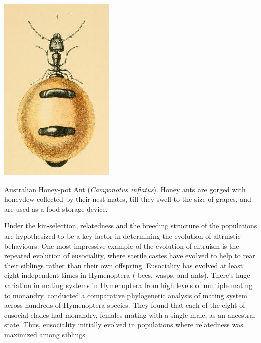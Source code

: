 \begin{marginfigure}
\begin{center}
\includegraphics[width= 0.7 \textwidth]{illustration_images/Quant_gen/honey_ant/honey_ant.png}
\end{center}
\caption{Australian Honey-pot Ant ({\it Camponotus inflatus}). Honey ants are gorged with
  honeydew collected by their nest mates, till they swell to the size
  of grapes, and are used as a food storage
  device.    } \label{fig:honey_ant}
\end{marginfigure} 
Under the kin-selection, relatedness and the breeding structure of the populations are
hypothesized to be a key factor in determining the evolution of altruistic behaviours. 
One most impressive example of the evolution of altruism is the
repeated evolution of eusociality, where sterile castes have evolved
to help to rear their siblings rather than their own offspring. Eusociality has evolved at least eight independent times in
 Hymenoptera ( bees, wasps, and ants). There's huge variation in
 mating systems in Hymenoptera from high levels of multiple mating to monandry. \citet{hughes2008ancestral} conducted a
comparative phylogenetic analysis of mating system across hundreds of Hymenoptera species. They found that each of the eight of
eusocial clades had monandry, females mating with a single male, as an ancestral
state. Thus, eusociality initially evolved in populations where
relatedness was maximized among siblings.

